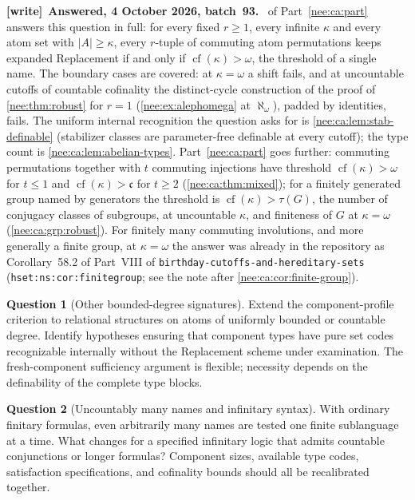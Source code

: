 \documentclass[11pt,letterpaper]{article}
\numberwithin{equation}{section}
\theoremstyle{plain}
\theoremstyle{definition}
\newtheorem{question}[question]{Question}
\theoremstyle{remark}
\newcommand{\cf}{\operatorname{cf}}
\newcommand{\cont}{\mathfrak c}
\newenvironment{writenote}[1][]{\par\smallskip\begingroup\small\raggedright
 \setlength{\parindent}{1.25em}\noindent\textbf{[write]}\if\relax\detokenize{#1}\relax\else~\textbf{#1.}\fi\ }%
 {\par\endgroup\smallskip}
\begin{document}
\begin{writenote}[Answered, 4 October 2026, batch~93]
 of Part~\ref{nee:ca:part} answers this question in full: for every fixed $r\geq1$, every infinite $\kappa$ and every atom set with $|A|\geq\kappa$, every $r$-tuple of commuting atom permutations keeps expanded Replacement if and only if $\cf(\kappa)>\omega$, the threshold of a single name. The boundary cases are covered: at $\kappa=\omega$ a shift fails, and at uncountable cutoffs of countable cofinality the distinct-cycle construction of the proof of \cref{nee:thm:robust} for $r=1$ (\cref{nee:ex:alephomega} at $\aleph_\omega$), padded by identities, fails. The uniform internal recognition the question asks for is \cref{nee:ca:lem:stab-definable} (stabilizer classes are parameter-free definable at every cutoff); the type count is \cref{nee:ca:lem:abelian-types}. Part~\ref{nee:ca:part} goes further: commuting permutations together with $t$ commuting injections have threshold $\cf(\kappa)>\omega$ for $t\leq1$ and $\cf(\kappa)>\cont$ for $t\geq2$ (\cref{nee:ca:thm:mixed}); for a finitely generated group named by generators the threshold is $\cf(\kappa)>\tau(G)$, the number of conjugacy classes of subgroups, at uncountable $\kappa$, and finiteness of $G$ at $\kappa=\omega$ (\cref{nee:ca:grp:robust}). For finitely many commuting involutions, and more generally a finite group, at $\kappa=\omega$ the answer was already in the repository as Corollary~58.2 of Part~VIII of \nolinkurl{birthday-cutoffs-and-hereditary-sets} (\texttt{hset:ns:cor:finitegroup}; see the note after \cref{nee:ca:cor:finite-group}).
\end{writenote}

\begin{question}[Other bounded-degree signatures]
Extend the component-profile criterion to relational structures on atoms of uniformly bounded or countable degree. Identify hypotheses ensuring that component types have pure set codes recognizable internally without the Replacement scheme under examination. The fresh-component sufficiency argument is flexible; necessity depends on the definability of the complete type blocks.
\end{question}

\begin{question}[Uncountably many names and infinitary syntax]
With ordinary finitary formulas, even arbitrarily many names are tested one finite sublanguage at a time. What changes for a specified infinitary logic that admits countable conjunctions or longer formulas? Component sizes, available type codes, satisfaction specifications, and cofinality bounds should all be recalibrated together.
\end{question}
\end{document}

